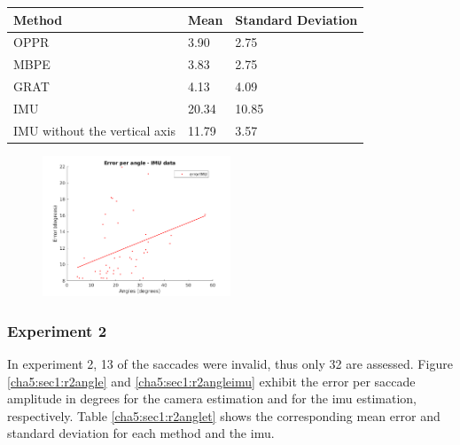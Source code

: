 \begin{table}[ht]
	\centering
\begin{tabular}{| l | l | l |}
	\hline
	Method & Mean & Standard Deviation \\
	\hline
	OPPR &  3.90 \degree & 2.75 \degree \\
	\hline
	MBPE &  3.83 \degree & 2.75 \degree \\
	\hline
	GRAT &  4.13 \degree & 4.09 \degree \\ 
	\hline
	IMU &  20.34 \degree & 10.85 \degree \\ 
	\hline
	IMU without the vertical axis &  11.79 \degree & 3.57 \degree \\ 
	\hline
\end{tabular}
\label{cha5:sec1:r1anglet}
\end{table}

\begin{figure}[ht]
	\centering
	\includegraphics[width=0.5\textwidth]{images/sim/imuerrorissue.png}
	\label{cha5:sec1:imuerrorissue}
\end{figure}


\subsubsection{Experiment 2}
In experiment 2, 13 of the saccades were invalid, thus only 32 are  assessed. Figure \ref{cha5:sec1:r2angle} and \ref{cha5:sec1:r2angleimu} exhibit the error per saccade amplitude in degrees for the camera estimation and for the \acrshort{imu} estimation, respectively. Table \ref{cha5:sec1:r2anglet} shows the corresponding mean error and standard deviation for each method and the \acrshort{imu}.

